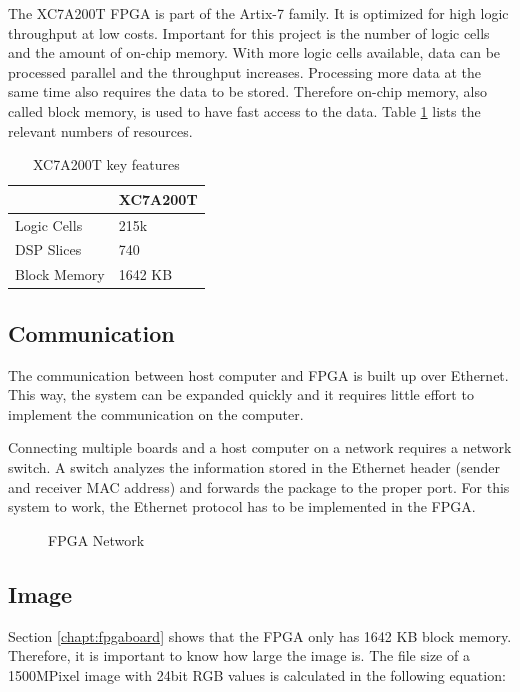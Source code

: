 The XC7A200T FPGA is part of the Artix-7 family. It is optimized for high logic
throughput at low costs. Important for this project is the number of logic cells
and the amount of on-chip memory. With more logic cells available, data can be
processed parallel and the throughput increases. Processing more data at the
same time also requires the data to be stored. Therefore on-chip memory, also
called block memory, is used to have fast access to the data. Table 
\ref{tab:XC7A200T} lists the relevant numbers of resources.

\begin{table}[tb!]
    \centering
    \begin{tabular}{l l}
        \toprule
         & XC7A200T \\
        \midrule
        Logic Cells & 215k \\
        DSP Slices & 740 \\
        Block Memory & 1642 KB \\
        \bottomrule
    \end{tabular}
    \caption{XC7A200T key features \cite{xilinx_ac701}}
    \label{tab:XC7A200T}
\end{table}

\subsection{Communication} \label{chapt:mission:communication}
The communication between host computer and FPGA is built up over Ethernet.
This way, the system can be expanded quickly and it requires little effort to
implement the communication on the computer.

Connecting multiple boards and a host computer on a network requires a network
switch. A switch analyzes the information stored in the Ethernet header (sender
and receiver MAC address) and forwards the package to the proper port. For this
system to work, the Ethernet protocol has to be implemented in the FPGA.

\begin{figure}[h]
    \centering
    
    \caption{FPGA Network}
    \label{fig:fpganetwork}
\end{figure}

\subsection{Image} \label{chapt:image}
Section \ref{chapt:fpgaboard} shows that the FPGA only has 1642 KB block memory. Therefore, it is important to know how large the image is. The file size of a 1500MPixel image with 24bit RGB values is calculated in the following equation:

